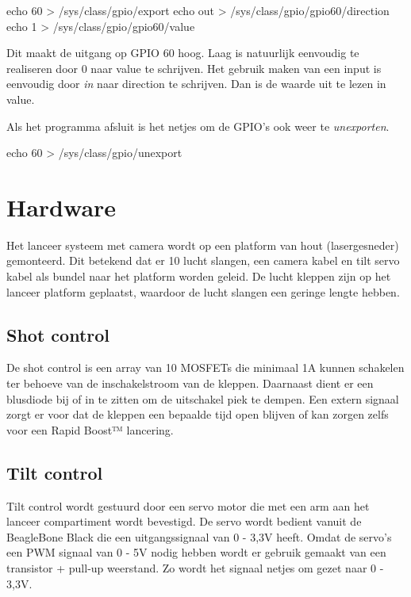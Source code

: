 \begin{cppcode}
echo 60 > /sys/class/gpio/export
echo out > /sys/class/gpio/gpio60/direction
echo 1 > /sys/class/gpio/gpio60/value
\begin{cppcode}

Dit maakt de uitgang op GPIO 60 hoog. Laag is natuurlijk eenvoudig te realiseren
door 0 naar value te schrijven.
Het gebruik maken van een input is eenvoudig door \emph{in} naar direction te schrijven.
Dan is de waarde uit te lezen in value.

Als het programma afsluit is het netjes om de GPIO's ook weer te \emph{unexporten}.

\begin{cppcode}
echo 60 > /sys/class/gpio/unexport
\end{cppcode}


\section{Hardware}
\label{sec:hardware}
Het lanceer systeem met camera wordt op een platform van hout (lasergesneder) 
gemonteerd. Dit betekend dat er 10 lucht slangen, een camera kabel en tilt servo 
kabel als bundel naar het platform worden geleid. De lucht kleppen zijn op het 
lanceer platform geplaatst, waardoor de lucht slangen een geringe lengte hebben.

\subsection{Shot control}
\label{sub:shotContr}
De shot control is een array van 10 MOSFETs die minimaal 1A kunnen schakelen ter behoeve 
van de inschakelstroom van de kleppen. Daarnaast dient er een blusdiode bij of in te 
zitten om de uitschakel piek te dempen. Een extern signaal zorgt er voor dat de kleppen 
een bepaalde tijd open blijven of kan zorgen zelfs voor een Rapid Boost™ lancering.

\subsection{Tilt control}
\label{sub:tiltContr}
Tilt control wordt gestuurd door een servo motor die met een arm aan het lanceer 
compartiment wordt bevestigd. De servo wordt bedient vanuit de BeagleBone Black die een 
uitgangssignaal van 0 - 3,3V heeft. Omdat de servo's een PWM signaal van 0 - 5V nodig 
hebben wordt er gebruik gemaakt van een transistor + pull-up weerstand. Zo wordt het 
signaal netjes om gezet naar 0 - 3,3V.


\end{cppcode}
\end{cppcode}
